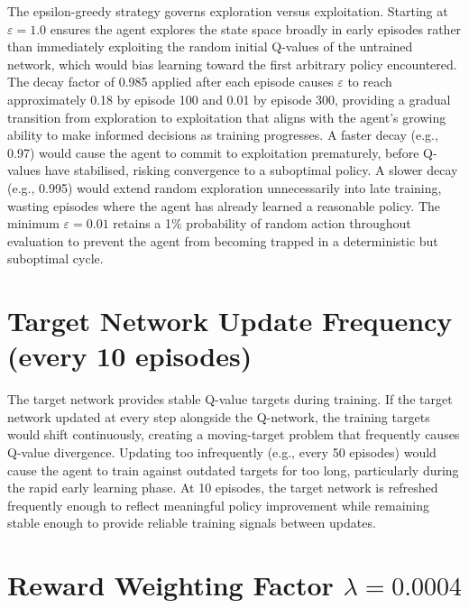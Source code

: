 The epsilon-greedy strategy governs exploration versus exploitation. Starting at \( \varepsilon = 1.0 \) ensures the agent explores the state space broadly in early episodes rather than immediately exploiting the random initial Q-values of the untrained network, which would bias learning toward the first arbitrary policy encountered. The decay factor of 0.985 applied after each episode causes \( \varepsilon \) to reach approximately 0.18 by episode 100 and 0.01 by episode 300, providing a gradual transition from exploration to exploitation that aligns with the agent's growing ability to make informed decisions as training progresses. A faster decay (e.g., 0.97) would cause the agent to commit to exploitation prematurely, before Q-values have stabilised, risking convergence to a suboptimal policy. A slower decay (e.g., 0.995) would extend random exploration unnecessarily into late training, wasting episodes where the agent has already learned a reasonable policy. The minimum \( \varepsilon = 0.01 \) retains a 1\% probability of random action throughout evaluation to prevent the agent from becoming trapped in a deterministic but suboptimal cycle.

\section{Target Network Update Frequency (every 10 episodes)}

The target network provides stable Q-value targets during training. If the target network updated at every step alongside the Q-network, the training targets would shift continuously, creating a moving-target problem that frequently causes Q-value divergence. Updating too infrequently (e.g., every 50 episodes) would cause the agent to train against outdated targets for too long, particularly during the rapid early learning phase. At 10 episodes, the target network is refreshed frequently enough to reflect meaningful policy improvement while remaining stable enough to provide reliable training signals between updates.

\section{Reward Weighting Factor \( \lambda = 0.0004 \)}

